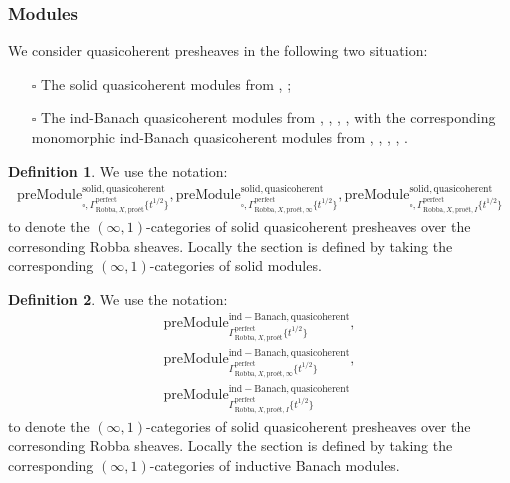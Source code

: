 \documentclass[12pt]{book}
\theoremstyle{definition}
\newtheorem{definition}{Definition}
\begin{document}
\subsubsection{Modules}


\noindent We consider quasicoherent presheaves in the following two situation:
\begin{itemize}
\item[$\square$] The solid quasicoherent modules from \cite{CS1}, \cite{CS2};
\item[$\square$] The ind-Banach quasicoherent modules from \cite{BK}, \cite{BBK}, \cite{BBBK}, \cite{KKM}, \cite{KM} with the corresponding monomorphic ind-Banach quasicoherent modules from \cite{BK}, \cite{BBK}, \cite{BBBK}, \cite{KKM}, \cite{KM}.
\end{itemize}

\begin{definition}
We use the notation:
\begin{align}
\mathrm{preModule}^\mathrm{solid,quasicoherent}_{\square,\Gamma^\mathrm{perfect}_{\text{Robba},X,\text{pro\'et}}\{t^{1/2}\}},\mathrm{preModule}^\mathrm{solid,quasicoherent}_{\square,\Gamma^\mathrm{perfect}_{\text{Robba},X,\text{pro\'et},\infty}\{t^{1/2}\}},
\mathrm{preModule}^\mathrm{solid,quasicoherent}_{\square,\Gamma^\mathrm{perfect}_{\text{Robba},X,\text{pro\'et},I}\{t^{1/2}\}} 
\end{align}
to denote the $(\infty,1)$-categories of solid quasicoherent presheaves over the corresonding Robba sheaves. Locally the section is defined by taking the corresponding $(\infty,1)$-categories of solid modules.
\end{definition}

\begin{definition}
We use the notation:
\begin{align}
\mathrm{preModule}^\mathrm{ind-Banach,quasicoherent}_{\Gamma^\mathrm{perfect}_{\text{Robba},X,\text{pro\'et}}\{t^{1/2}\}},\\
\mathrm{preModule}^\mathrm{ind-Banach,quasicoherent}_{\Gamma^\mathrm{perfect}_{\text{Robba},X,\text{pro\'et},\infty}\{t^{1/2}\}},\\
\mathrm{preModule}^\mathrm{ind-Banach,quasicoherent}_{\Gamma^\mathrm{perfect}_{\text{Robba},X,\text{pro\'et},I}\{t^{1/2}\}} 
\end{align}
to denote the $(\infty,1)$-categories of solid quasicoherent presheaves over the corresonding Robba sheaves. Locally the section is defined by taking the corresponding $(\infty,1)$-categories of inductive Banach  modules. 
\end{definition}
\end{document}
